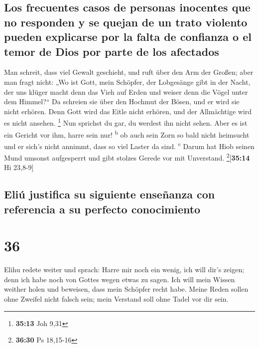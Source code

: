 \hypertarget{los-frecuentes-casos-de-personas-inocentes-que-no-responden-y-se-quejan-de-un-trato-violento-pueden-explicarse-por-la-falta-de-confianza-o-el-temor-de-dios-por-parte-de-los-afectados}{%
\subsection{Los frecuentes casos de personas inocentes que no responden
y se quejan de un trato violento pueden explicarse por la falta de
confianza o el temor de Dios por parte de los
afectados}\label{los-frecuentes-casos-de-personas-inocentes-que-no-responden-y-se-quejan-de-un-trato-violento-pueden-explicarse-por-la-falta-de-confianza-o-el-temor-de-dios-por-parte-de-los-afectados}}

 Man schreit, dass viel Gewalt geschieht, und ruft über
den Arm der Großen;  aber man fragt nicht: „Wo ist Gott,
mein Schöpfer, der Lobgesänge gibt in der Nacht,  der uns
klüger macht denn das Vieh auf Erden und weiser denn die Vögel unter dem
Himmel?{}``  Da schreien sie über den Hochmut der Bösen,
und er wird sie nicht erhören.  Denn Gott wird das Eitle
nicht erhören, und der Allmächtige wird es nicht ansehen. \footnote{\textbf{35:13}
  Joh 9,31}  Nun sprichst du gar, du werdest ihn nicht
sehen. Aber es ist ein Gericht vor ihm, harre sein nur!
\textsuperscript{b}  ob auch sein Zorn so bald nicht
heimsucht und er sich's nicht annimmt, dass so viel Laster da sind.
\textsuperscript{c}  Darum hat Hiob seinen Mund umsonst
aufgesperrt und gibt stolzes Gerede vor mit Unverstand.
\footnote{\textbf{36:30} Ps 18,15-16}{[}\textbf{35:14} Hi 23,8-9{]}

\hypertarget{eliuxfa-justifica-su-siguiente-enseuxf1anza-con-referencia-a-su-perfecto-conocimiento}{%
\subsection{Eliú justifica su siguiente enseñanza con referencia a su
perfecto
conocimiento}\label{eliuxfa-justifica-su-siguiente-enseuxf1anza-con-referencia-a-su-perfecto-conocimiento}}

\hypertarget{section-35}{%
\section{36}\label{section-35}}

 Elihu redete weiter und sprach:  Harre mir
noch ein wenig, ich will dir's zeigen; denn ich habe noch von Gottes
wegen etwas zu sagen.  Ich will mein Wissen weither holen
und beweisen, dass mein Schöpfer recht habe.  Meine Reden
sollen ohne Zweifel nicht falsch sein; mein Verstand soll ohne Tadel vor
dir sein.

